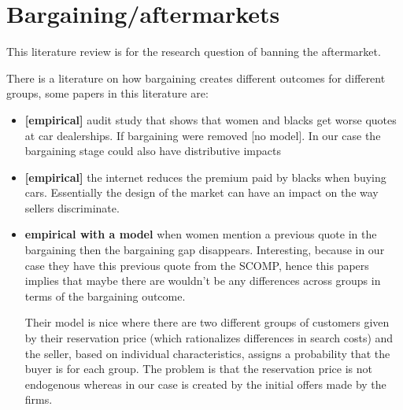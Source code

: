 \documentclass[12pt]{article}
\theoremstyle{plain}
\theoremstyle{plain}
\begin{document}
 

\section{Bargaining/aftermarkets}

This literature review is for the research question of banning the aftermarket. 

There is a literature on how bargaining creates different outcomes for different groups, some papers in this literature are:  

\begin{itemize}
    \item \textcite{ayres_race_1995} \textbf{[empirical]} audit study that shows that women and blacks get worse quotes at car dealerships. If bargaining were removed [no model]. In our case the bargaining stage could also have distributive impacts

    \item \textcite{morton_consumer_2003} \textbf{[empirical]} the internet reduces the premium paid by blacks when buying cars. Essentially the design of the market can have an impact on the way sellers discriminate. 

    \item \textcite{busse_repairing_2017} \textbf{{empirical with a model}}  when women mention a previous quote in the bargaining then the bargaining gap disappears. Interesting, because in our case they have this previous quote from the SCOMP, hence this papers implies that maybe there are wouldn't be any differences across groups in terms of the bargaining outcome.

    Their model is nice where there are two different groups of customers given by their reservation price (which rationalizes differences in search costs) and the seller, based on individual characteristics, assigns a probability that the buyer is for each group. The problem is that the reservation price is not endogenous whereas in our case is created by the initial offers made by the firms.


\end{itemize}
\end{document}
